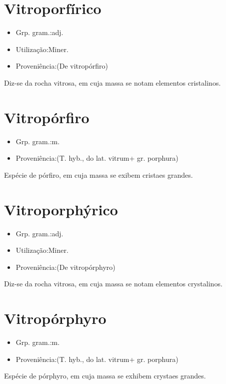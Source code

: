 \documentclass{article}
\begin{document}
\section{Vitroporfírico}
\begin{itemize}
\item {Grp. gram.:adj.}
\end{itemize}
\begin{itemize}
\item {Utilização:Miner.}
\end{itemize}
\begin{itemize}
\item {Proveniência:(De \textunderscore vitropórfiro\textunderscore )}
\end{itemize}
Diz-se da rocha vitrosa, em cuja massa se notam elementos cristalinos.
\section{Vitropórfiro}
\begin{itemize}
\item {Grp. gram.:m.}
\end{itemize}
\begin{itemize}
\item {Proveniência:(T. hyb., do lat. \textunderscore vitrum\textunderscore  + gr. \textunderscore porphura\textunderscore )}
\end{itemize}
Espécie de pórfiro, em cuja massa se exibem cristaes grandes.
\section{Vitroporphýrico}
\begin{itemize}
\item {Grp. gram.:adj.}
\end{itemize}
\begin{itemize}
\item {Utilização:Miner.}
\end{itemize}
\begin{itemize}
\item {Proveniência:(De \textunderscore vitropórphyro\textunderscore )}
\end{itemize}
Diz-se da rocha vitrosa, em cuja massa se notam elementos crystalinos.
\section{Vitropórphyro}
\begin{itemize}
\item {Grp. gram.:m.}
\end{itemize}
\begin{itemize}
\item {Proveniência:(T. hyb., do lat. \textunderscore vitrum\textunderscore  + gr. \textunderscore porphura\textunderscore )}
\end{itemize}
Espécie de pórphyro, em cuja massa se exhibem crystaes grandes.
\end{document}
